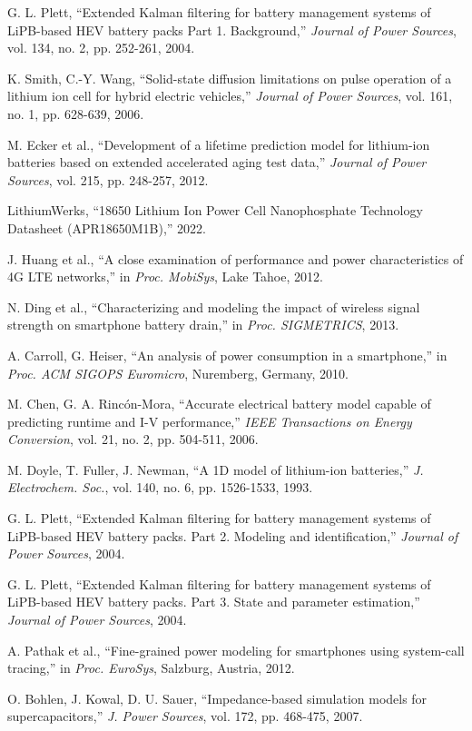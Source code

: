 \documentclass[11pt,a4paper]{ctexart}
\begin{document}
\begin{enumerate}[label={[\arabic*]},leftmargin=2.6em,itemsep=0.3em]
\item G. L. Plett, ``Extended Kalman filtering for battery management systems of LiPB-based HEV battery packs Part 1. Background,'' \textit{Journal of Power Sources}, vol. 134, no. 2, pp. 252-261, 2004.
\item K. Smith, C.-Y. Wang, ``Solid-state diffusion limitations on pulse operation of a lithium ion cell for hybrid electric vehicles,'' \textit{Journal of Power Sources}, vol. 161, no. 1, pp. 628-639, 2006.
\item M. Ecker et al., ``Development of a lifetime prediction model for lithium-ion batteries based on extended accelerated aging test data,'' \textit{Journal of Power Sources}, vol. 215, pp. 248-257, 2012.
\item LithiumWerks, ``18650 Lithium Ion Power Cell Nanophosphate\textregistered{} Technology Datasheet (APR18650M1B),'' 2022.
\item J. Huang et al., ``A close examination of performance and power characteristics of 4G LTE networks,'' in \textit{Proc. MobiSys}, Lake Tahoe, 2012.
\item N. Ding et al., ``Characterizing and modeling the impact of wireless signal strength on smartphone battery drain,'' in \textit{Proc. SIGMETRICS}, 2013.
\item A. Carroll, G. Heiser, ``An analysis of power consumption in a smartphone,'' in \textit{Proc. ACM SIGOPS Euromicro}, Nuremberg, Germany, 2010.
\item M. Chen, G. A. Rinc\'on-Mora, ``Accurate electrical battery model capable of predicting runtime and I-V performance,'' \textit{IEEE Transactions on Energy Conversion}, vol. 21, no. 2, pp. 504-511, 2006.
\item M. Doyle, T. Fuller, J. Newman, ``A 1D model of lithium-ion batteries,'' \textit{J. Electrochem. Soc.}, vol. 140, no. 6, pp. 1526-1533, 1993.
\item G. L. Plett, ``Extended Kalman filtering for battery management systems of LiPB-based HEV battery packs. Part 2. Modeling and identification,'' \textit{Journal of Power Sources}, 2004.
\item G. L. Plett, ``Extended Kalman filtering for battery management systems of LiPB-based HEV battery packs. Part 3. State and parameter estimation,'' \textit{Journal of Power Sources}, 2004.
\item A. Pathak et al., ``Fine-grained power modeling for smartphones using system-call tracing,'' in \textit{Proc. EuroSys}, Salzburg, Austria, 2012.
\item O. Bohlen, J. Kowal, D. U. Sauer, ``Impedance-based simulation models for supercapacitors,'' \textit{J. Power Sources}, vol. 172, pp. 468-475, 2007.
\end{enumerate}
\end{document}
